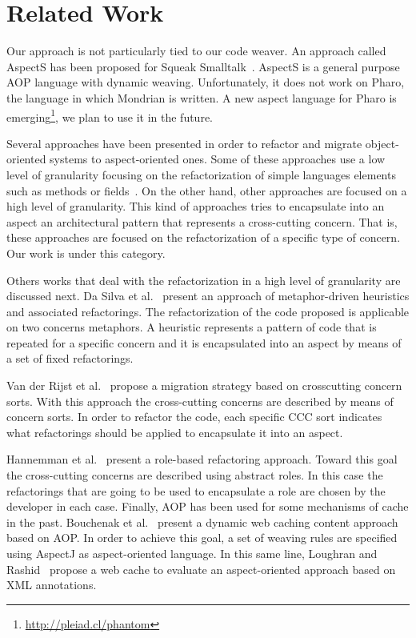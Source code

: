 \documentclass[preprint,10pt]{sigplanconf}
\newcommand{\seclabel}[1]{\label{sec:#1}}
\begin{document}
\section{Related Work}\seclabel{relatedWork}
Our approach is not particularly tied to our code weaver. An approach called AspectS has been proposed for Squeak Smalltalk~\cite{Hirschfeld2002}. AspectS is a general purpose AOP language with dynamic weaving. Unfortunately, it does not work on Pharo, the language in which Mondrian is written. A new aspect language for Pharo is emerging\footnote{\url{http://pleiad.cl/phantom}}, we plan to use it in the future.

Several approaches have been presented in order to refactor and migrate object-oriented systems to aspect-oriented ones. Some of these approaches use a low level of granularity focusing on the refactorization of simple languages elements such as methods or fields~\cite{Ceccato2008,Tonella2005,Binkley2005,Deursen2005,Hannemann2003}. 
On the other hand, other approaches are focused on a high level of granularity. This kind of approaches tries to encapsulate into an aspect an architectural pattern that represents a cross-cutting concern. That is, these approaches are focused on the refactorization of a specific type of concern. Our work is under this category. 

Others works that deal with the refactorization in a high level of granularity are discussed next. Da Silva et al.~\cite{Silva2009} present an approach of metaphor-driven heuristics and associated refactorings. The refactorization of the code proposed is applicable on two concerns metaphors. A heuristic represents a pattern of code that is repeated for a specific concern and it is encapsulated into an aspect by means of a set of fixed refactorings.

Van der Rijst et al.~\cite{Rijst2008,Marin2009} propose a migration strategy based on crosscutting concern sorts. With this approach the cross-cutting concerns are described by means of concern sorts. In order to refactor the code, each specific CCC sort indicates what refactorings should be applied to encapsulate it into an aspect. 

Hannemman et al.~\cite{Hannemann2005} present a role-based refactoring approach. Toward this goal the cross-cutting concerns are described using abstract roles. In this case the refactorings that are going to be used to encapsulate a role are chosen by the developer in each case.
Finally, AOP has been used for some mechanisms of cache in the past. Bouchenak et al.~\cite{Bouchenak2006} present a dynamic web caching content approach based on AOP. In order to achieve this goal, a set of weaving rules are specified using AspectJ as aspect-oriented language. In this same line, Loughran and Rashid~\cite{Loughran2004} propose a web cache to evaluate an aspect-oriented approach based on XML annotations. 
\end{document}
